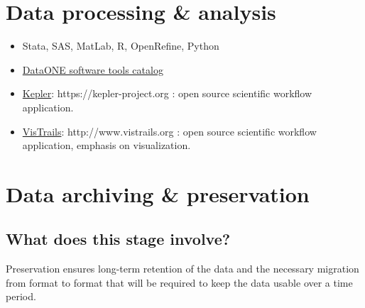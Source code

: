 \documentclass{tufte-handout}
\begin{document}
\section{Data processing \& analysis}\label{data-processing-analysis}

\begin{itemize}
\itemsep1pt\parskip0pt
\item
  Stata, SAS, MatLab, R, OpenRefine, Python
\item
  \href{http://www.dataone.org/software_tools_catalog}{DataONE software tools catalog}
  \item
  \href{https://kepler-project.org}{Kepler}: https://kepler-project.org : open source scientific workflow  application.
\item
  \href{http://www.vistrails.org/index.php/Main_Page}{VisTrails}: http://www.vistrails.org : open source scientific workflow application, emphasis on visualization.
\end{itemize}





\section{Data archiving \& preservation}\label{data-archiving-preservation} 

\subsection{What does this stage
involve?}\label{what-does-this-stage-involve}

Preservation ensures long-term retention of the data and the necessary migration from format to format that will be required to keep the data usable over a time period.
\end{document}
